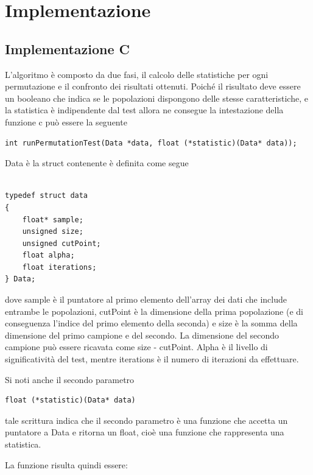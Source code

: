 \section{Implementazione}

\subsection{Implementazione C} \label{impC}
L'algoritmo è composto da due fasi, il calcolo delle statistiche per ogni permutazione e il confronto dei risultati ottenuti.
Poiché il risultato deve essere un booleano che indica se le popolazioni dispongono delle stesse caratteristiche, e la statistica è indipendente dal test allora ne consegue la intestazione della funzione c può essere la seguente


\begin{lstlisting}[style=CStyle]
int runPermutationTest(Data *data, float (*statistic)(Data* data));
\end{lstlisting}

Data è la struct contenente è definita come segue

\begin{lstlisting}[style=CStyle]

typedef struct data
{	
	float* sample;
	unsigned size;
	unsigned cutPoint;
	float alpha;
	float iterations;
} Data;

\end{lstlisting}

dove sample è il puntatore al primo elemento dell'array dei dati che include entrambe le popolazioni, cutPoint è la dimensione della prima popolazione (e di conseguenza l'indice del primo elemento della seconda) e size è la somma della dimensione del primo campione e del secondo. La dimensione del secondo campione può essere ricavata come size - cutPoint. Alpha è il livello di significatività del test, mentre iterations è il numero di iterazioni da effettuare.

Si noti anche il secondo parametro
\begin{lstlisting}[style=CStyle]
float (*statistic)(Data* data)
\end{lstlisting}

tale scrittura indica che il secondo parametro è una funzione che accetta un puntatore a Data e ritorna un float, cioè una funzione che rappresenta una statistica.

La funzione risulta quindi essere:

